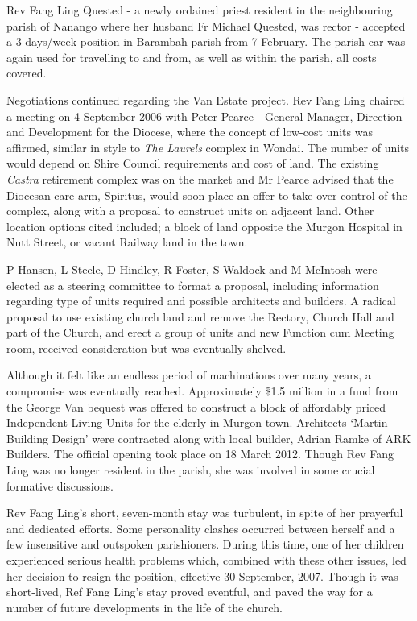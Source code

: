 Rev Fang Ling Quested - a newly ordained priest resident in the neighbouring parish of Nanango where her husband Fr Michael Quested, was rector - accepted a 3 days/week position in Barambah parish from 7 February. The parish car was again used for travelling to and from, as well as within the parish, all costs covered.



Negotiations continued regarding the Van Estate project. Rev Fang Ling chaired a meeting on 4 September 2006 with Peter Pearce - General Manager, Direction and Development for the Diocese, where the concept of low-cost units was affirmed, similar in style to \emph{The Laurels} complex in Wondai. The number of units would depend on Shire Council requirements and cost of land. The existing \emph{Castra} retirement complex was on the market and Mr Pearce advised that the Diocesan care arm, Spiritus, would soon place an offer to take over control of the complex, along with a proposal to construct units on adjacent land. Other location options cited included; a block of land opposite the Murgon Hospital in Nutt Street, or vacant Railway land in the town.



P Hansen, L Steele, D Hindley, R Foster, S Waldock and M McIntosh were elected as a steering committee to format a proposal, including information regarding type of units required and possible architects and builders. A radical proposal to use existing church land and remove the Rectory, Church Hall and part of the Church, and erect a group of units and new Function cum Meeting room, received consideration but was eventually shelved.



Although it felt like an endless period of machinations over many years, a compromise was eventually reached. Approximately \$1.5 million in a fund from the George Van bequest was offered to construct a block of affordably priced Independent Living Units for the elderly in Murgon town. Architects `Martin Building Design' were contracted along with local builder, Adrian Ramke of ARK Builders. The official opening took place on 18 March 2012. Though Rev Fang Ling was no longer resident in the parish, she was involved in some crucial formative discussions.



Rev Fang Ling's short, seven-month stay was turbulent, in spite of her prayerful and dedicated efforts. Some personality clashes occurred between herself and a few insensitive and outspoken parishioners. During this time, one of her children experienced serious health problems which, combined with these other issues, led her decision to resign the position, effective 30 September, 2007. Though it was short-lived, Ref Fang Ling's stay proved eventful, and paved the way for a number of future developments in the life of the church.



